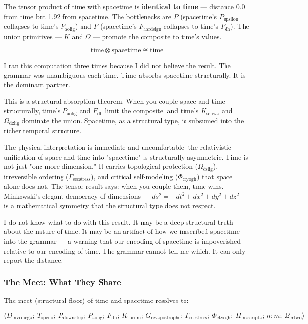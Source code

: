 \documentclass[12pt,a4paper]{article}
\begin{document}
The tensor product of time with spacetime is \textbf{identical to time} --- distance 0.0 from time but 1.92 from spacetime. The bottlenecks are $P$ (spacetime's $P_{\text{upsilon}}$ collapses to time's $P_{\text{aolig}}$) and $F$ (spacetime's $F_{\text{hardsign}}$ collapses to time's $F_{\text{dh}}$). The union primitives --- $K$ and $\Omega$ --- promote the composite to time's values.

\[\text{time} \otimes \text{spacetime} \cong \text{time}\]

I ran this computation three times because I did not believe the result. The grammar was unambiguous each time. Time absorbs spacetime structurally. It is the dominant partner.

This is a structural absorption theorem. When you couple space and time structurally, time's $P_{\text{aolig}}$ and $F_{\text{dh}}$ limit the composite, and time's $K_{\text{schwa}}$ and $\Omega_{\text{dzlig}}$ dominate the union. Spacetime, as a structural type, is subsumed into the richer temporal structure.

The physical interpretation is immediate and uncomfortable: the relativistic unification of space and time into "spacetime" is structurally asymmetric. Time is not just "one more dimension." It carries topological protection ($\Omega_{\text{dzlig}}$), irreversible ordering ($\Gamma_{\text{secstress}}$), and critical self-modeling ($\Phi_{\text{ctyogh}}$) that space alone does not. The tensor result says: when you couple them, time wins. Minkowski's elegant democracy of dimensions --- $ds^2 = -dt^2 + dx^2 + dy^2 + dz^2$ --- is a mathematical symmetry that the structural type does not respect.

I do not know what to do with this result. It may be a deep structural truth about the nature of time. It may be an artifact of how we imscribed spacetime into the grammar --- a warning that our encoding of spacetime is impoverished relative to our encoding of time. The grammar cannot tell me which. It can only report the distance.

\subsubsection{The Meet: What They Share}

The meet (structural floor) of time and spacetime resolves to:

\[\langle D_{\text{invomega}};\ T_{\text{openo}};\ R_{\text{downstep}};\ P_{\text{aolig}};\ F_{\text{dh}};\ K_{\text{turnm}};\ G_{\text{revapostrophe}};\ \Gamma_{\text{secstress}};\ \Phi_{\text{ctyogh}};\ H_{\text{invscripta}};\ n{:}m;\ \Omega_{\text{crtwo}} \rangle\]
\end{document}
